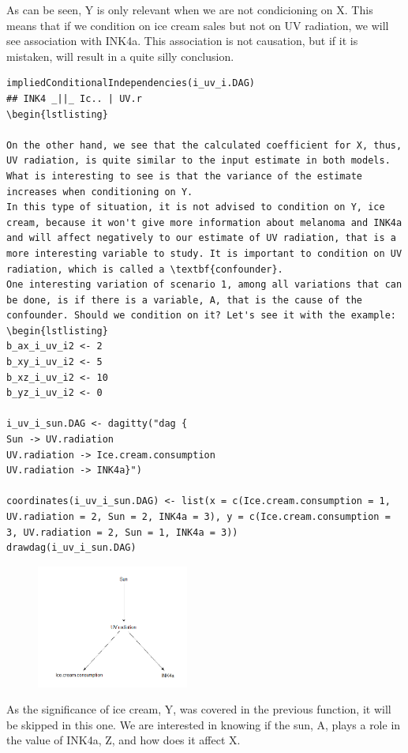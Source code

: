 \documentclass{article}
\begin{document}
As can be seen, Y is only relevant when we are not condicioning on X. This means that if we condition on ice cream sales but not on UV radiation, we will see association with INK4a. This association is not causation, but if it is mistaken, will result in a quite silly conclusion.

\begin{lstlisting}
impliedConditionalIndependencies(i_uv_i.DAG)
## INK4 _||_ Ic.. | UV.r
\begin{lstlisting}

On the other hand, we see that the calculated coefficient for X, thus, UV radiation, is quite similar to the input estimate in both models. What is interesting to see is that the variance of the estimate increases when conditioning on Y.
In this type of situation, it is not advised to condition on Y, ice cream, because it won't give more information about melanoma and INK4a and will affect negatively to our estimate of UV radiation, that is a more interesting variable to study. It is important to condition on UV radiation, which is called a \textbf{confounder}.
One interesting variation of scenario 1, among all variations that can be done, is if there is a variable, A, that is the cause of the confounder. Should we condition on it? Let's see it with the example:
\begin{lstlisting}
b_ax_i_uv_i2 <- 2
b_xy_i_uv_i2 <- 5
b_xz_i_uv_i2 <- 10
b_yz_i_uv_i2 <- 0

i_uv_i_sun.DAG <- dagitty("dag {
Sun -> UV.radiation
UV.radiation -> Ice.cream.consumption
UV.radiation -> INK4a}")

coordinates(i_uv_i_sun.DAG) <- list(x = c(Ice.cream.consumption = 1, UV.radiation = 2, Sun = 2, INK4a = 3), y = c(Ice.cream.consumption = 3, UV.radiation = 2, Sun = 1, INK4a = 3))
drawdag(i_uv_i_sun.DAG)
\end{lstlisting}

\begin{figure}[h]
\includegraphics[width=5cm]{i_uv_i_s.DAG.png}
\centering
\end{figure}
As the significance of ice cream, Y, was covered in the previous function, it will be skipped in this one. We are interested in knowing if the sun, A, plays a role in the value of INK4a, Z, and how does it affect X.
\end{document}
